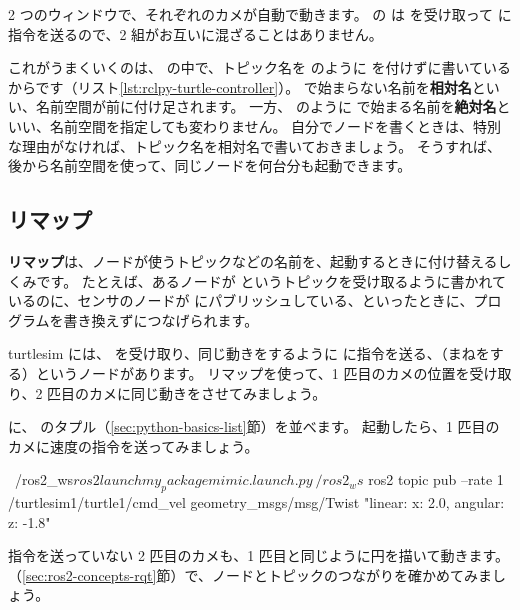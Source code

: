 2 つのウィンドウで、それぞれのカメが自動で動きます。
 の  は  を受け取って  に指令を送るので、2 組がお互いに混ざることはありません。

\begin{point}[相対名と絶対名]
  これがうまくいくのは、 の中で、トピック名を  のように \cmd{/} を付けずに書いているからです（リスト\ref{lst:rclpy-turtle-controller}）。
  \cmd{/} で始まらない名前を\textbf{相対名}といい、名前空間が前に付け足されます。
  一方、 のように \cmd{/} で始まる名前を\textbf{絶対名}といい、名前空間を指定しても変わりません。
  自分でノードを書くときは、特別な理由がなければ、トピック名を相対名で書いておきましょう。
  そうすれば、後から名前空間を使って、同じノードを何台分も起動できます。
\end{point}

\subsection{リマップ}

\textbf{リマップ}は、ノードが使うトピックなどの名前を、起動するときに付け替えるしくみです。
たとえば、あるノードが  というトピックを受け取るように書かれているのに、センサのノードが  にパブリッシュしている、といったときに、プログラムを書き換えずにつなげられます。

turtlesim には、 を受け取り、同じ動きをするように  に指令を送る、（まねをする）というノードがあります。
リマップを使って、1 匹目のカメの位置を受け取り、2 匹目のカメに同じ動きをさせてみましょう。


 に、 のタプル（\ref{sec:python-basics-list}節）を並べます。
起動したら、1 匹目のカメに速度の指令を送ってみましょう。

\begin{terminal}[1 匹目のカメを動かす]
~/ros2_ws$ ros2 launch my_package mimic.launch.py
~/ros2_ws$ ros2 topic pub --rate 1 /turtlesim1/turtle1/cmd_vel geometry_msgs/msg/Twist "{linear: {x: 2.0}, angular: {z: -1.8}}"
\end{terminal}

指令を送っていない 2 匹目のカメも、1 匹目と同じように円を描いて動きます。
（\ref{sec:ros2-concepts-rqt}節）で、ノードとトピックのつながりを確かめてみましょう。

